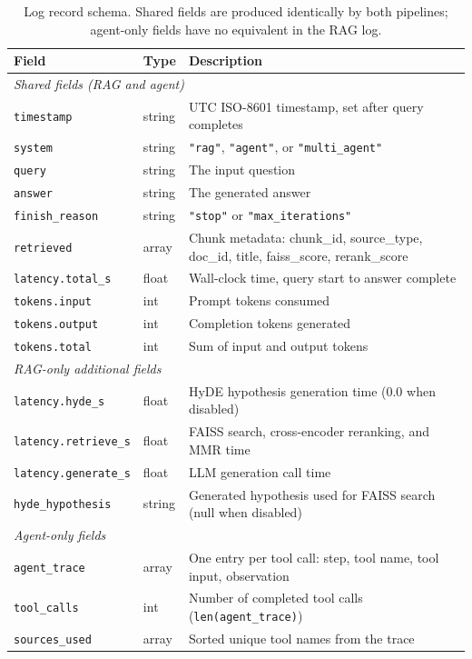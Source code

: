 \begin{table}[ht]
\centering
\small
\setlength{\tabcolsep}{4pt}
\caption{Log record schema. Shared fields are produced identically by both pipelines; agent-only fields have no equivalent in the RAG log.}
\label{tab:log_schema}
\begin{tabular}{p{4.5cm}p{1.2cm}p{7.8cm}}
\hline
\textbf{Field} & \textbf{Type} & \textbf{Description} \\
\hline
\multicolumn{3}{l}{\textit{Shared fields (RAG and agent)}} \\
\texttt{timestamp}        & string  & UTC ISO-8601 timestamp, set after query completes \\
\texttt{system}           & string  & \texttt{"rag"}, \texttt{"agent"}, or \texttt{"multi\_agent"} \\
\texttt{query}            & string  & The input question \\
\texttt{answer}           & string  & The generated answer \\
\texttt{finish\_reason}   & string  & \texttt{"stop"} or \texttt{"max\_iterations"} \\
\texttt{retrieved}        & array   & Chunk metadata: chunk\_id, source\_type, doc\_id, title, faiss\_score, rerank\_score \\
\texttt{latency.total\_s} & float   & Wall-clock time, query start to answer complete \\
\texttt{tokens.input}     & int     & Prompt tokens consumed \\
\texttt{tokens.output}    & int     & Completion tokens generated \\
\texttt{tokens.total}     & int     & Sum of input and output tokens \\
\hline
\multicolumn{3}{l}{\textit{RAG-only additional fields}} \\
\texttt{latency.hyde\_s}     & float  & HyDE hypothesis generation time (0.0 when disabled) \\
\texttt{latency.retrieve\_s} & float  & FAISS search, cross-encoder reranking, and MMR time \\
\texttt{latency.generate\_s} & float  & LLM generation call time \\
\texttt{hyde\_hypothesis}    & string & Generated hypothesis used for FAISS search (null when disabled) \\
\hline
\multicolumn{3}{l}{\textit{Agent-only fields}} \\
\texttt{agent\_trace}     & array   & One entry per tool call: step, tool name, tool input, observation \\
\texttt{tool\_calls}      & int     & Number of completed tool calls (\texttt{len(agent\_trace)}) \\
\texttt{sources\_used}    & array   & Sorted unique tool names from the trace \\
\hline
\end{tabular}
\end{table}

